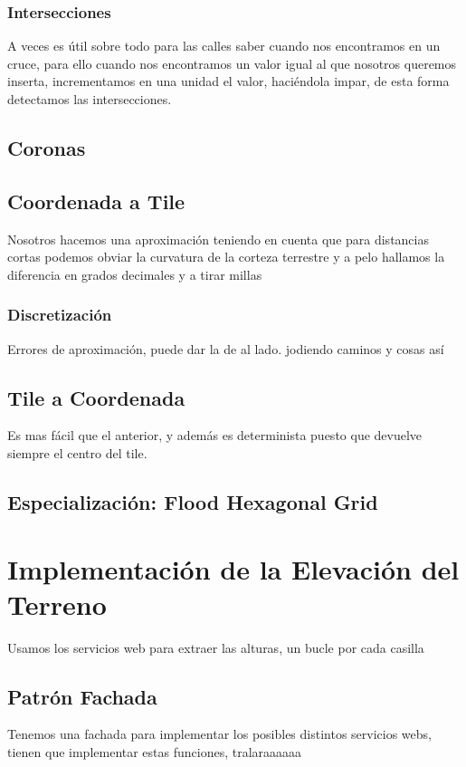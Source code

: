 \subsubsection*{Intersecciones}
A veces es útil sobre todo para las calles saber cuando nos encontramos en un
cruce, para ello cuando nos encontramos un valor igual al que nosotros queremos
inserta, incrementamos en una unidad el valor, haciéndola impar, de esta forma
detectamos las intersecciones.
\subsection*{Coronas}
\subsection*{Coordenada a Tile} \label{coordToTile}
Nosotros hacemos una aproximación teniendo en cuenta que para distancias cortas
podemos obviar la curvatura de la corteza terrestre y a pelo hallamos la
diferencia en grados decimales y a tirar millas
\subsubsection*{Discretización}
Errores de aproximación, puede dar la de al lado. jodiendo caminos y cosas así
\subsection*{Tile a Coordenada}
Es mas fácil que el anterior, y además es determinista puesto que devuelve
siempre el centro del tile.
\subsection*{Especialización: Flood Hexagonal Grid}
\section*{Implementación de la Elevación del Terreno}
Usamos los servicios web para extraer las alturas, un bucle por cada casilla
\subsection*{Patrón Fachada} %
Tenemos una fachada para implementar los posibles distintos servicios webs,
tienen que implementar estas funciones, tralaraaaaaa
